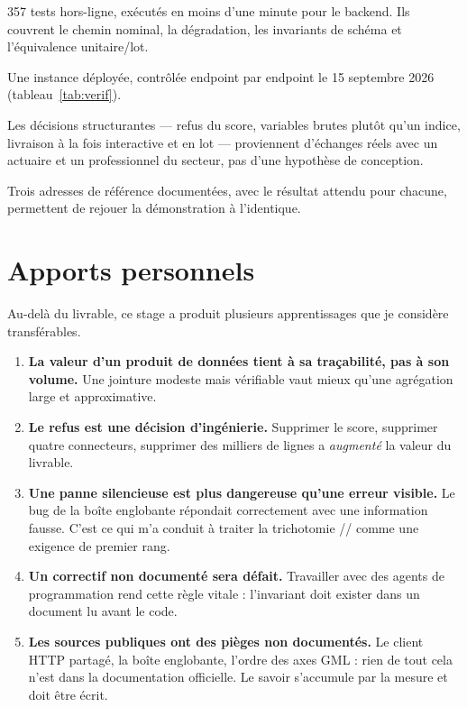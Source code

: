 \begin{description}[leftmargin=0em,style=nextline]
  \item[Tests automatisés.] 357 tests hors-ligne, exécutés en moins d'une
  minute pour le backend. Ils couvrent le chemin nominal, la dégradation, les
  invariants de schéma et l'équivalence unitaire/lot.
  \item[Vérification en ligne.] Une instance déployée, contrôlée endpoint par
  endpoint le 15 septembre 2026 (tableau~\ref{tab:verif}).
  \item[Confrontation au métier.] Les décisions structurantes — refus du score,
  variables brutes plutôt qu'un indice, livraison à la fois interactive et en
  lot — proviennent d'échanges réels avec un actuaire et un professionnel du
  secteur, pas d'une hypothèse de conception.
  \item[Reproductibilité de la démonstration.] Trois adresses de référence
  documentées, avec le résultat attendu pour chacune, permettent de rejouer la
  démonstration à l'identique.
\end{description}

\section{Apports personnels}

Au-delà du livrable, ce stage a produit plusieurs apprentissages que je
considère transférables.

\begin{enumerate}[leftmargin=1.6em]
  \item \textbf{La valeur d'un produit de données tient à sa traçabilité, pas à
        son volume.} Une jointure modeste mais vérifiable vaut mieux qu'une
        agrégation large et approximative.
  \item \textbf{Le refus est une décision d'ingénierie.} Supprimer le score,
        supprimer quatre connecteurs, supprimer des milliers de lignes a
        \emph{augmenté} la valeur du livrable.
  \item \textbf{Une panne silencieuse est plus dangereuse qu'une erreur
        visible.} Le bug de la boîte englobante répondait correctement avec une
        information fausse. C'est ce qui m'a conduit à traiter la trichotomie
        // comme une exigence de premier rang.
  \item \textbf{Un correctif non documenté sera défait.} Travailler avec des
        agents de programmation rend cette règle vitale : l'invariant doit
        exister dans un document lu avant le code.
  \item \textbf{Les sources publiques ont des pièges non documentés.} Le client
        HTTP partagé, la boîte englobante, l'ordre des axes GML : rien de tout
        cela n'est dans la documentation officielle. Le savoir s'accumule par
        la mesure et doit être écrit.
\end{enumerate}

